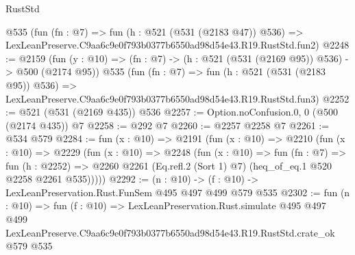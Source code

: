 \begin{lexlean}{RustStd}
\begin{coremodule}
    @535
    (fun (fn : @7) =>
    fun (h : @521 (@531 (@2183 @47)) @536) =>
    LexLeanPreserve.C9aa6c9e0f793b0377b6550ad98d54e43.R19.RustStd.fun2)
@2248 := @2159
    (fun (y : @10) => (fn : @7) -> (h : @521 (@531 (@2169 @95)) @536) -> @500 (@2174 @95))
    @535
    (fun (fn : @7) =>
    fun (h : @521 (@531 (@2183 @95)) @536) =>
    LexLeanPreserve.C9aa6c9e0f793b0377b6550ad98d54e43.R19.RustStd.fun3)
@2252 := @521 (@531 (@2169 @435)) @536
@2257 := Option.noConfusion.{0, 0} (@500 (@2174 @435)) @7
@2258 := @292 @7
@2260 := @2257 @2258 @7
@2261 := @534 @579
@2284 := fun (x : @10) =>
  @2191
    (fun (x : @10) =>
    @2210
      (fun (x : @10) =>
      @2229
        (fun (x : @10) =>
        @2248
          (fun (x : @10) =>
          fun (fn : @7) =>
          fun (h : @2252) =>
          @2260 @2261 (Eq.refl.{2} (Sort 1) @7) (heq_of_eq.{1} @520 @2258 @2261 @535)))))
@2292 := (n : @10) -> (f : @10) -> LexLeanPreservation.Rust.FunSem @495 @497 @499 @579 @535
@2302 := fun (n : @10) =>
  fun (f : @10) =>
  LexLeanPreservation.Rust.simulate
    @495
    @497
    @499
    LexLeanPreserve.C9aa6c9e0f793b0377b6550ad98d54e43.R19.RustStd.crate_ok
    @579
    @535
\end{coremodule}
\end{lexlean}
